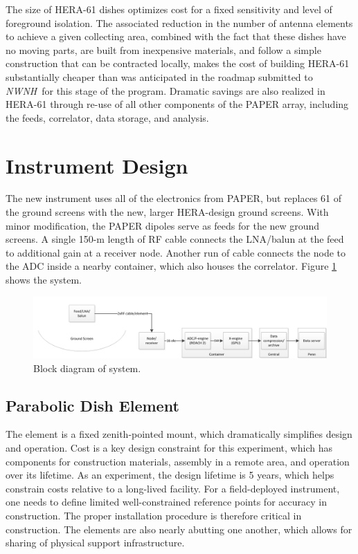 \documentclass[preprint]{aastex}
\def\nwnh{{\sl NWNH}}
\begin{document}
The size of HERA-61 dishes optimizes cost for a fixed sensitivity and
level of foreground isolation.  The associated reduction in the number
of antenna elements to achieve a given collecting area, combined with
the fact that these dishes have no moving parts, are built from
inexpensive materials, and follow a simple construction that can be
contracted locally, makes the cost of building HERA-61 substantially
cheaper than was anticipated in the roadmap submitted to \nwnh\ for this
stage of the program. Dramatic savings are also realized in HERA-61
through re-use of all other components of the PAPER array, including the
feeds, correlator, data storage, and analysis.  

\vspace{-0.25in}
\section{Instrument Design}
\vspace{-6pt}
\label{InstDes}
The new instrument uses all of the electronics from PAPER, but replaces 61 of the ground screens with the new,
larger HERA-design ground screens.  With minor modification, the PAPER dipoles serve as feeds for the new ground screens.  A single 
150-m length of RF cable connects the LNA/balun at the feed to additional gain at a receiver node. Another run of
cable connects the node to the ADC inside a nearby container, which also houses the correlator.  
Figure \ref{fig:blockDiagram} shows the system.

\begin{figure}[h]
\centering
\includegraphics[width=\textwidth]{plots/hera61-block.png}
\caption{Block diagram of system.}
\label{fig:blockDiagram} 
\end{figure}

\vspace{-0.25in}
\subsection{Parabolic Dish Element}
\vspace{-6pt}

The element is a fixed zenith-pointed mount, which dramatically simplifies design and operation.  
Cost is a key design constraint for this experiment, which has components for construction materials, 
assembly in a remote area, and operation over its lifetime.  As an experiment, the design lifetime is 5 years, 
which helps constrain costs relative to a long-lived facility.  For a field-deployed instrument, one needs to 
define limited well-constrained reference points for accuracy in construction.  The proper installation procedure 
is therefore critical in construction.  The elements are also nearly abutting one another, which allows for sharing 
of physical support infrastructure.
\end{document}
